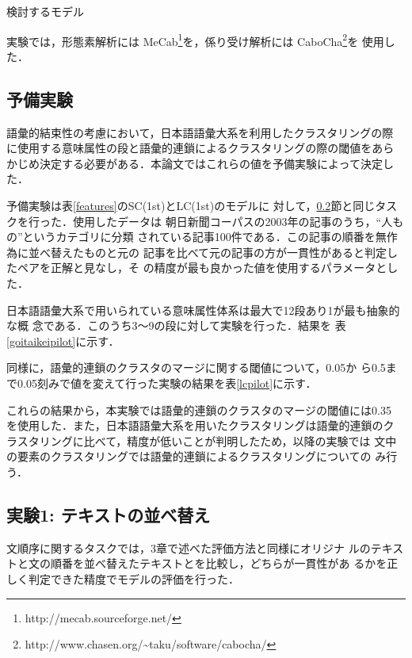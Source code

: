 \documentclass[japanese]{jnlp_1.4}
\begin{document}
   \begin{table}[t]
     \caption{検討するモデル}\label{features}

   \end{table}

   実験では，形態素解析には
   MeCab\footnote{http://mecab.sourceforge.net/}を，係り受け解析には
   CaboCha\footnote{http://www.chasen.org/\~{}taku/software/cabocha/}を
   使用した．



 \subsection{予備実験}\label{pilot}

 語彙的結束性の考慮において，日本語語彙大系を利用したクラスタリングの際
 に使用する意味属性の段と語彙的連鎖によるクラスタリングの際の閾値をあら
 かじめ決定する必要がある．本論文ではこれらの値を予備実験によって決定した．

 予備実験は表\ref{features}のSC(1st)とLC(1st)のモデルに
 対して，\ref{sentenceordering}節と同じタスクを行った．使用したデータは
 朝日新聞コーパスの2003年の記事のうち，``人もの''というカテゴリに分類
 されている記事100件である．この記事の順番を無作為に並べ替えたものと元の
 記事を比べて元の記事の方が一貫性があると判定したペアを正解と見なし，そ
 の精度が最も良かった値を使用するパラメータとした．

 日本語語彙大系で用いられている意味属性体系は最大で12段あり1が最も抽象的な概
 念である．このうち3〜9の段に対して実験を行った．結果を
 表\ref{goitaikeipilot}に示す．

 同様に，語彙的連鎖のクラスタのマージに関する閾値について，0.05か
 ら0.5まで0.05刻みで値を変えて行った実験の結果を表\ref{lcpilot}に示す．

 これらの結果から，本実験では語彙的連鎖のクラスタのマージの閾値には0.35
 を使用した．また，日本語語彙大系を用いたクラスタリングは語彙的連鎖のク
 ラスタリングに比べて，精度が低いことが判明したため，以降の実験では
 文中の要素のクラスタリングでは語彙的連鎖によるクラスタリングについての
 み行う．

 


 \subsection{実験1: テキストの並べ替え}\label{sentenceordering}

 文順序に関するタスクでは，3章で述べた評価方法と同様にオリジナ
 ルのテキストと文の順番を並べ替えたテキストとを比較し，どちらが一貫性があ
 るかを正しく判定できた精度でモデルの評価を行った．
\end{document}
